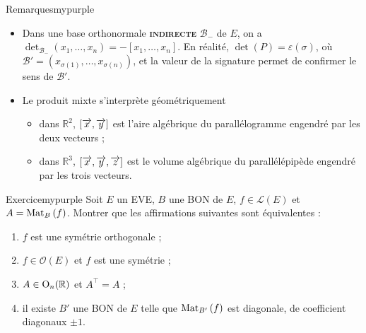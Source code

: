     \begin{omed}{Remarques}{mypurple}
        \begin{itemize}[label=\textcolor{mypurple}{$\star$}]
            \item Dans une base orthonormale \textbf{\textsc{indirecte}} $\mathcal{B}_-$ de $E$, on a $\det_{\mathcal{B}_-}(x_1,\ldots,x_n) = - [x_1,\ldots,x_n]$. En réalité, $\det(P) = \varepsilon(\sigma)$, où $\mathcal{B}' = (x_{\sigma(1)}, \ldots, x_{\sigma(n)})$, et la valeur de la signature permet de confirmer le sens de $\mathcal{B}'$.
            \item Le produit mixte s’interprète géométriquement 
            \begin{itemize}
                \item dans $\mathbb{R}^2$, $\left[\overrightarrow{x},\overrightarrow{y}\right]$ est l’aire algébrique du parallélogramme engendré par les deux vecteurs ;
                \item dans $\mathbb{R}^3$, $\left[\overrightarrow{x},\overrightarrow{y}, \overrightarrow{z}\right]$ est le volume algébrique du parallélépipède engendré par les trois vecteurs.
            \end{itemize}
        \end{itemize}
    \end{omed}

    \begin{omed}{Exercice}{mypurple}
        Soit $E$ un EVE, $B$ une BON de $E$, $f \in \mathcal{L}(E)$ et $A = \text{Mat}_{B}\left(f\right)$. Montrer que les affirmations suivantes sont équivalentes :
        \begin{enumerate}
            \item $f$ est une symétrie orthogonale ;
            \item $f \in \mathcal{O}(E)$ et $f$ est une symétrie ;
            \item $A \in \operatorname{O}_n(\mathbb{R})$ et $A^{\top} = A$ ;
            \item il existe $B'$ une BON de $E$ telle que $\text{Mat}_{B'}\left(f\right)$ est diagonale, de coefficient diagonaux $\pm 1$.
        \end{enumerate}
    \end{omed}

